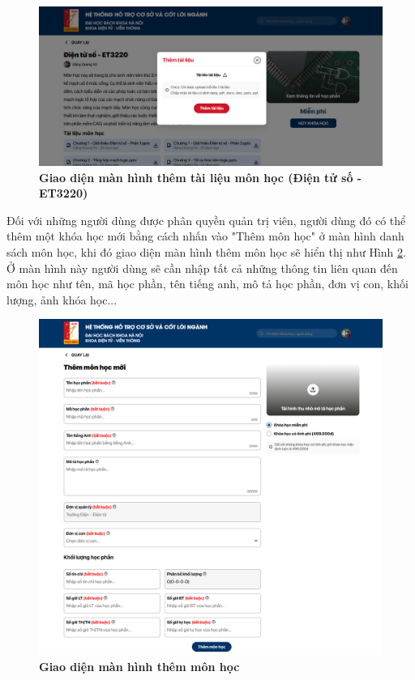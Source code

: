 \documentclass{article}
\begin{document}
	 \begin{figure}[!ht]
	 	\centering
	 	\includegraphics[trim= 10pt 10pt 10pt 10pt, clip, width=14cm]{localhost_3000_courses_ET3220_doc.png}
	 	\caption [Giao diện màn hình thêm tài liệu môn học (Điện tử số - ET3220)]{\bfseries \fontsize{12pt}{0pt}\selectfont Giao diện màn hình thêm tài liệu môn học (Điện tử số - ET3220)}
	 	\label{fig48}
	 \end{figure}
	 
	 Đối với những người dùng được phân quyền quản trị viên, người dùng đó có thể thêm một khóa học mới bằng cách nhấn vào "Thêm môn học" ở màn hình danh sách môn học, khi đó giao diện màn hình thêm môn học sẽ hiển thị như Hình \ref{fig49}. Ở màn hình này người dùng sẽ cần nhập tất cả những thông tin liên quan đến môn học như tên, mã học phần, tên tiếng anh, mô tả học phần, đơn vị con, khối lượng, ảnh khóa học...
	 
	 \begin{figure}[!ht]
	 	\centering
	 	\includegraphics[trim= 10pt 10pt 10pt 10pt, clip, width=16cm]{localhost_3000_add-course.png}
	 	\caption [Giao diện màn hình thêm môn học]{\bfseries \fontsize{12pt}{0pt}\selectfont Giao diện màn hình thêm môn học}
	 	\label{fig49}
	 \end{figure}
	 
\end{document}
